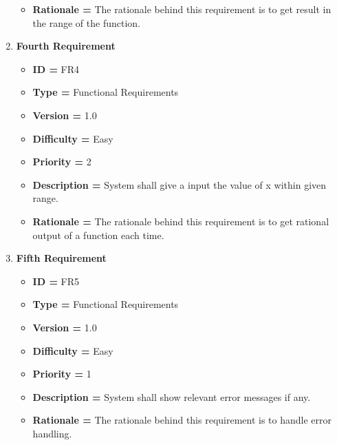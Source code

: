 \documentclass[a4paper,12pt]{article}
\begin{document}
\begin{enumerate}
\begin{itemize}
        \item \textbf{Rationale = }	The rationale behind this requirement is to get result in the range of the function.
    \end{itemize}
    \item\textbf{Fourth  Requirement}
    \begin{itemize}
        \item \textbf{ID = } FR4
        \item \textbf{Type = } Functional Requirements
        \item \textbf{Version = } 1.0
        \item \textbf{Difficulty = } Easy
        \item \textbf{Priority = } 2
        \item \textbf{Description = } System shall give a input the value of x  within given range.
        \item \textbf{Rationale = }	The rationale behind this requirement is to get rational output of a function each time.
    \end{itemize}
     \item\textbf{Fifth  Requirement}
    	 \begin{itemize}
        \item \textbf{ID = } FR5
        \item \textbf{Type = } Functional Requirements
        \item \textbf{Version = } 1.0
        \item \textbf{Difficulty = } Easy
        \item \textbf{Priority = } 1
        \item \textbf{Description = } System shall show relevant error messages if any.
        \item \textbf{Rationale = }	The rationale behind this requirement is to handle error handling.
        \end{itemize}
        

\end{enumerate}
\end{document}
